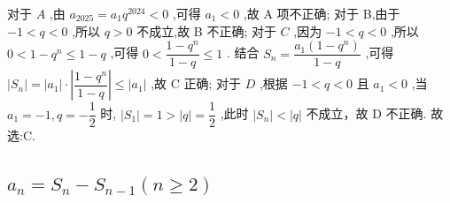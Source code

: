 \begin{enumerate}
\begin{jieda}
        对于 ${A}$ ,由 ${a}_{2025} = {a}_{1}{q}^{2024} < 0$ ,可得 ${a}_{1} < 0$ ,故 A 项不正确; 对于 B,由于 $- 1 < q < 0$ ,所以 $q > 0$ 不成立,故 B 不正确; 对于 ${C}$ ,因为 $- 1 < q < 0$ ,所以 $0 < 1 - {q}^{n} \leq  1 - q$ ,可得 $0 <  \dfrac{1 - {q}^{n}}{1 - q} \leq  1$ . 结合 ${S}_{n} = \dfrac{{a}_{1}\left( {1 - {q}^{n}}\right) }{1 - q}$ ,可得 $\left| {S}_{n}\right|  = \left| {a}_{1}\right|  \cdot  \left| \dfrac{1 - {q}^{n}}{1 - q}\right|  \leq  \left| {a}_{1}\right|$ ,故 C 正确; 对于 ${D}$ ,根据 $- 1 < q < 0$ 且 ${a}_{1} < 0$ ,当 ${a}_{1} =  - 1,q =  - \dfrac{1}{2}$ 时, $\left| {S}_{1}\right|  = 1 > \left| q\right|  = \dfrac{1}{2}$ ,此时 $\left| {S}_{n}\right|  < \left| q\right|$ 不成立，故 D 不正确. 故选:C.
    \end{jieda}
\end{enumerate}
\subsection*{$a_n = S_n - S_{n-1}(n \geq 2)$}
